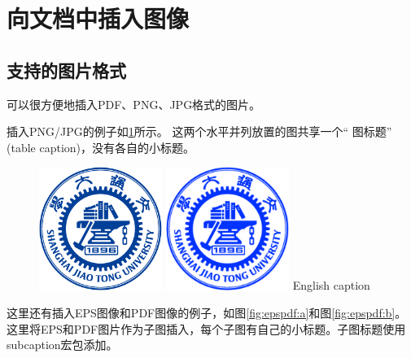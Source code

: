 \documentclass[doctor,openright,twoside]{sjtuthesis}
\theoremstyle{plain}
\theoremstyle{definition}
\theoremstyle{remark}
\theoremstyle{ocrenumbox}
\theoremstyle{plain}
\begin{document}
\section{向文档中插入图像}
\label{sec:insertimage}

\subsection{支持的图片格式}
\label{sec:imageformat}

\XeTeX 可以很方便地插入PDF、PNG、JPG格式的图片。

插入PNG/JPG的例子如\ref{fig:SRR}所示。
这两个水平并列放置的图共享一个`` 图标题'' (table caption)，没有各自的小标题。

\begin{figure}[!htp]
  \centering
  \includegraphics[width=4cm]{example/sjtulogo.png}
  \hspace{1cm}
  \includegraphics[width=4cm]{example/sjtulogo.jpg}
    {English caption}
  \label{fig:SRR}
\end{figure}

这里还有插入EPS图像和PDF图像的例子，如图\ref{fig:epspdf:a}和图\ref{fig:epspdf:b}。这里将EPS和PDF图片作为子图插入，每个子图有自己的小标题。子图标题使用subcaption宏包添加。
\end{document}
